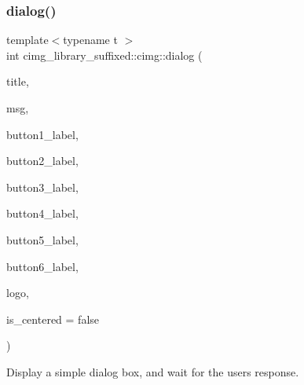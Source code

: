 \subsubsection{\texorpdfstring{dialog()}{dialog()}}
{\footnotesize\ttfamily template$<$typename t $>$ \\
int cimg\+\_\+library\+\_\+suffixed\+::cimg\+::dialog (\begin{DoxyParamCaption}\item[{const \hyperlink{classchar}{char} $\ast$const}]{title,  }\item[{const \hyperlink{classchar}{char} $\ast$const}]{msg,  }\item[{const \hyperlink{classchar}{char} $\ast$const}]{button1\+\_\+label,  }\item[{const \hyperlink{classchar}{char} $\ast$const}]{button2\+\_\+label,  }\item[{const \hyperlink{classchar}{char} $\ast$const}]{button3\+\_\+label,  }\item[{const \hyperlink{classchar}{char} $\ast$const}]{button4\+\_\+label,  }\item[{const \hyperlink{classchar}{char} $\ast$const}]{button5\+\_\+label,  }\item[{const \hyperlink{classchar}{char} $\ast$const}]{button6\+\_\+label,  }\item[{const \hyperlink{structcimg__library__suffixed_1_1CImg}{C\+Img}$<$ t $>$ \&}]{logo,  }\item[{const bool}]{is\+\_\+centered = {\ttfamily false} }\end{DoxyParamCaption})\hspace{0.3cm}{\ttfamily [inline]}}



Display a simple dialog box, and wait for the user\textquotesingle{}s response. 


